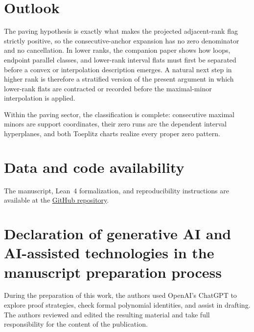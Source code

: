\documentclass{amsart}
\numberwithin{equation}{section}
\theoremstyle{definition}
\theoremstyle{remark}
\begin{document}
\section{Outlook}\label{sec:outlook}

The paving hypothesis is exactly what makes the projected adjacent-rank flag strictly positive, so the consecutive-anchor expansion has no zero denominator and no cancellation.  In lower ranks, the companion paper shows how loops, endpoint parallel classes, and lower-rank interval flats must first be separated before a convex or interpolation description emerges.  A natural next step in higher rank is therefore a stratified version of the present argument in which lower-rank flats are contracted or recorded before the maximal-minor interpolation is applied.

Within the paving sector, the classification is complete: consecutive maximal minors are support coordinates, their zero runs are the dependent interval hyperplanes, and both Toeplitz charts realize every proper zero pattern.

\section*{Data and code availability}
The manuscript, Lean~4 formalization, and reproducibility instructions are available at
the \href{https://github.com/Cheng-Yaoyu/paving-toeplitz-positroids-formalization}{GitHub repository}.

\section*{Declaration of generative AI and AI-assisted technologies in the manuscript preparation process}

During the preparation of this work, the authors used OpenAI's ChatGPT to explore proof strategies, check formal polynomial identities, and assist in drafting.  The authors reviewed and edited the resulting material and take full responsibility for the content of the publication.
\end{document}
